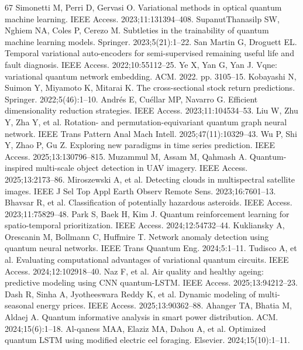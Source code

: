 \documentclass[pdflatex,sn-mathphys,Numbered]{sn-jnl}%
\begin{document}
\begin{thebibliography}{67}
 Simonetti M, Perri D, Gervasi O. Variational methods in optical quantum machine learning. IEEE Access. 2023;11:131394--408.
 SupanutThanasilp SW, Nghiem NA, Coles P, Cerezo M. Subtleties in the trainability of quantum machine learning models. Springer. 2023;5(21):1--22.
 San Martin G, Droguett EL. Temporal variational auto-encoders for semi-supervised remaining useful life and fault diagnosis. IEEE Access. 2022;10:55112--25.
 Ye X, Yan G, Yan J. Vqne: variational quantum network embedding. ACM. 2022. pp. 3105--15.
 Kobayashi N, Suimon Y, Miyamoto K, Mitarai K. The cross-sectional stock return predictions. Springer. 2022;5(46):1--10.
 Andrés E, Cuéllar MP, Navarro G. Efficient dimensionality reduction strategies. IEEE Access. 2023;11:104534--53.
 Liu W, Zhu Y, Zha Y, et al. Rotation- and permutation-equivariant quantum graph neural network. IEEE Trans Pattern Anal Mach Intell. 2025;47(11):10329--43.
 Wu P, Shi Y, Zhao P, Gu Z. Exploring new paradigms in time series prediction. IEEE Access. 2025;13:130796--815.
 Muzammul M, Assam M, Qahmash A. Quantum-inspired multi-scale object detection in UAV imagery. IEEE Access. 2025;13:2173--86.
 Miroszewski A, et al. Detecting clouds in multispectral satellite images. IEEE J Sel Top Appl Earth Observ Remote Sens. 2023;16:7601--13.
 Bhavsar R, et al. Classification of potentially hazardous asteroids. IEEE Access. 2023;11:75829--48.
 Park S, Baek H, Kim J. Quantum reinforcement learning for spatio-temporal prioritization. IEEE Access. 2024;12:54732--44.
 Kukliansky A, Orescanin M, Bollmann C, Huffmire T. Network anomaly detection using quantum neural networks. IEEE Trans Quantum Eng. 2024;5:1--11.
 Tudisco A, et al. Evaluating computational advantages of variational quantum circuits. IEEE Access. 2024;12:102918--40.
 Naz F, et al. Air quality and healthy ageing: predictive modeling using CNN quantum-LSTM. IEEE Access. 2025;13:94212--23.
 Dash R, Sinha A, Jyotheeswara Reddy K, et al. Dynamic modeling of multi-seasonal energy prices. IEEE Access. 2025;13:90362--88.
 Ahanger TA, Bhatia M, Aldaej A. Quantum informative analysis in smart power distribution. ACM. 2024;15(6):1--18.
 Al-qaness MAA, Elaziz MA, Dahou A, et al. Optimized quantum LSTM using modified electric eel foraging. Elsevier. 2024;15(10):1--11.

\end{thebibliography}
\end{document}

